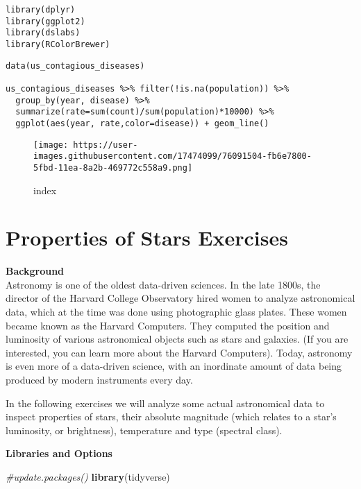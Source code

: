 \documentclass[]{article}
\newenvironment{Shaded}{\begin{snugshade}}{\end{snugshade}}
\newcommand{\CommentTok}[1]{\textcolor[rgb]{0.56,0.35,0.01}{\textit{#1}}}
\newcommand{\KeywordTok}[1]{\textcolor[rgb]{0.13,0.29,0.53}{\textbf{#1}}}
\newcommand{\NormalTok}[1]{#1}
\begin{document}
\begin{verbatim}
library(dplyr)
library(ggplot2)
library(dslabs)
library(RColorBrewer)
\end{verbatim}

\begin{verbatim}
data(us_contagious_diseases)

us_contagious_diseases %>% filter(!is.na(population)) %>% 
  group_by(year, disease) %>%
  summarize(rate=sum(count)/sum(population)*10000) %>%
  ggplot(aes(year, rate,color=disease)) + geom_line()
\end{verbatim}

\begin{figure}
\centering
\texttt{[image: https://user-images.githubusercontent.com/17474099/76091504-fb6e7800-5fbd-11ea-8a2b-469772c558a9.png]}
\caption{index}
\end{figure}

\hypertarget{properties-of-stars-exercises}{%
\section{Properties of Stars
Exercises}\label{properties-of-stars-exercises}}

\textbf{Background}\\
Astronomy is one of the oldest data-driven sciences. In the late 1800s,
the director of the Harvard College Observatory hired women to analyze
astronomical data, which at the time was done using photographic glass
plates. These women became known as the Harvard Computers. They computed
the position and luminosity of various astronomical objects such as
stars and galaxies. (If you are interested, you can learn more about the
Harvard Computers). Today, astronomy is even more of a data-driven
science, with an inordinate amount of data being produced by modern
instruments every day.

In the following exercises we will analyze some actual astronomical data
to inspect properties of stars, their absolute magnitude (which relates
to a star's luminosity, or brightness), temperature and type (spectral
class).

\textbf{Libraries and Options}

\begin{Shaded}
\begin{Highlighting}[]
\CommentTok{#update.packages()}
\KeywordTok{library}\NormalTok{(tidyverse)}
\end{Highlighting}
\end{Shaded}
\end{document}
